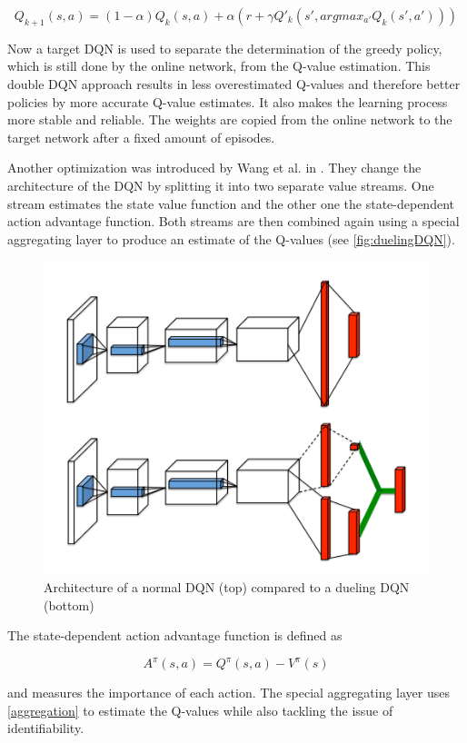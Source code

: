 \begin{equation} \label{DoubleQLearning}
	Q_{k+1}(s,a) = (1-\alpha) Q_k(s,a) + \alpha(r + \gamma Q'_k(s', argmax_{a'} Q_k(s',a'))) 
\end{equation}

Now a target DQN is used to separate the determination of the greedy policy, which is still done by the online network, from the Q-value estimation. This double DQN approach results in less overestimated Q-values and therefore better policies by more accurate Q-value estimates. It also makes the learning process more stable and reliable. The weights are copied from the online network to the target network after a fixed amount of episodes.

Another optimization was introduced by Wang et al. in \cite{Wang2016}. They change the architecture of the DQN by splitting it into two separate value streams. One stream estimates the state value function and the other one the state-dependent action advantage function. Both streams are then combined again using a special aggregating layer to produce an estimate of the Q-values (see \autoref{fig:duelingDQN}).  

\begin{figure}[ht]
	\centering
	\includegraphics[width=0.6\linewidth]{figures/duelingDQN.PNG}
	\caption{Architecture of a normal DQN (top) compared to a dueling DQN (bottom) \cite{Wang2016}}
	\label{fig:duelingDQN}
\end{figure}

The state-dependent action advantage function is defined as

\begin{equation} \label{advfunction}
	A^{\pi}(s,a) = Q^{\pi}(s,a) - V^{\pi}(s)
\end{equation}

and measures the importance of each action. The special aggregating layer uses \autoref{aggregation} to estimate the Q-values while also tackling the issue of identifiability. 

